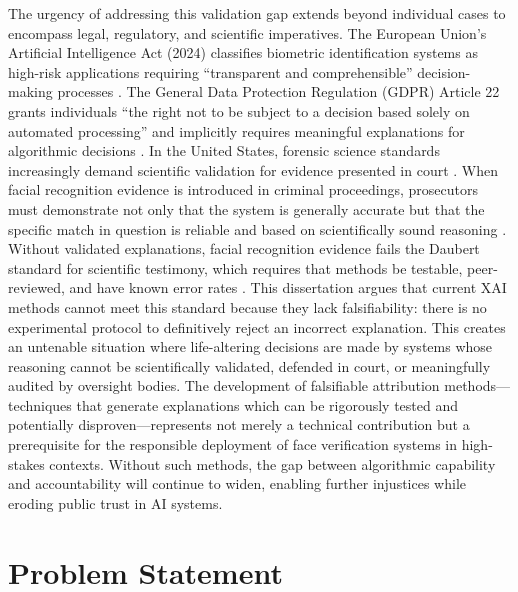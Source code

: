 The urgency of addressing this validation gap extends beyond individual cases to encompass legal, regulatory, and scientific imperatives. The European Union's Artificial Intelligence Act (2024) classifies biometric identification systems as high-risk applications requiring ``transparent and comprehensible'' decision-making processes \cite{euaiact2024}. The General Data Protection Regulation (GDPR) Article 22 grants individuals ``the right not to be subject to a decision based solely on automated processing'' and implicitly requires meaningful explanations for algorithmic decisions \cite{gdpr2016,wachter2017right}. In the United States, forensic science standards increasingly demand scientific validation for evidence presented in court \cite{nrc2009strengthening}. When facial recognition evidence is introduced in criminal proceedings, prosecutors must demonstrate not only that the system is generally accurate but that the specific match in question is reliable and based on scientifically sound reasoning \cite{fed702}. Without validated explanations, facial recognition evidence fails the Daubert standard for scientific testimony, which requires that methods be testable, peer-reviewed, and have known error rates \cite{daubert1993}. This dissertation argues that current XAI methods cannot meet this standard because they lack falsifiability: there is no experimental protocol to definitively reject an incorrect explanation. This creates an untenable situation where life-altering decisions are made by systems whose reasoning cannot be scientifically validated, defended in court, or meaningfully audited by oversight bodies. The development of falsifiable attribution methods---techniques that generate explanations which can be rigorously tested and potentially disproven---represents not merely a technical contribution but a prerequisite for the responsible deployment of face verification systems in high-stakes contexts. Without such methods, the gap between algorithmic capability and accountability will continue to widen, enabling further injustices while eroding public trust in AI systems.

\section{Problem Statement}
\label{sec:problem_statement}

